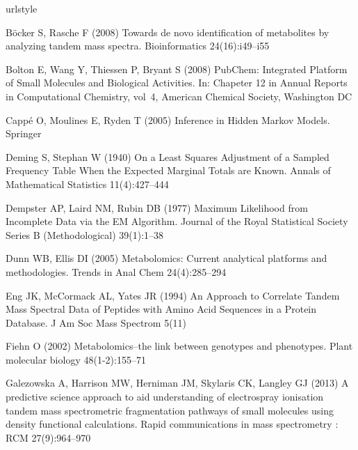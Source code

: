 \begin{thebibliography}{38}
\providecommand{\natexlab}[1]{#1}
\providecommand{\url}[1]{{#1}}
\providecommand{\urlprefix}{URL }
\expandafter\ifx\csname urlstyle\endcsname\relax
  \providecommand{\doi}[1]{DOI~\discretionary{}{}{}#1}\else
  \providecommand{\doi}{DOI~\discretionary{}{}{}\begingroup
  \urlstyle{rm}\Url}\fi
\providecommand{\eprint}[2][]{\url{#2}}

B\"{o}cker S, Rasche F (2008) {Towards de novo identification of metabolites by
  analyzing tandem mass spectra.} Bioinformatics
  24(16):i49--i55

Bolton E, Wang Y, Thiessen P, Bryant S (2008) {PubChem: Integrated Platform of
  Small Molecules and Biological Activities}. In: Chapeter 12 in Annual Reports
  in Computational Chemistry, vol~4, American Chemical Society, Washington DC

Capp\'{e} O, Moulines E, Ryden T (2005) {Inference in Hidden Markov Models}.
  Springer

Deming S, Stephan W (1940) {On a Least Squares Adjustment of a Sampled
  Frequency Table When the Expected Marginal Totals are Known}. Annals of
  Mathematical Statistics 11(4):427--444

Dempster AP, Laird NM, Rubin DB (1977) {Maximum Likelihood from Incomplete Data
  via the EM Algorithm}. Journal of the Royal Statistical Society Series B
  (Methodological) 39(1):1--38

Dunn WB, Ellis DI (2005) {Metabolomics: Current analytical platforms and
  methodologies}. Trends in Anal Chem 24(4):285--294

Eng JK, McCormack AL, Yates JR (1994) {An Approach to Correlate Tandem Mass
  Spectral Data of Peptides with Amino Acid Sequences in a Protein Database}. J
  Am Soc Mass Spectrom 5(11)

Fiehn O (2002) {Metabolomics--the link between genotypes and phenotypes.} Plant
  molecular biology 48(1-2):155--71

Galezowska A, Harrison MW, Herniman JM, Skylaris CK, Langley GJ (2013) {A
  predictive science approach to aid understanding of electrospray ionisation
  tandem mass spectrometric fragmentation pathways of small molecules using
  density functional calculations.} Rapid communications in mass spectrometry :
  RCM 27(9):964--970


\end{thebibliography}
